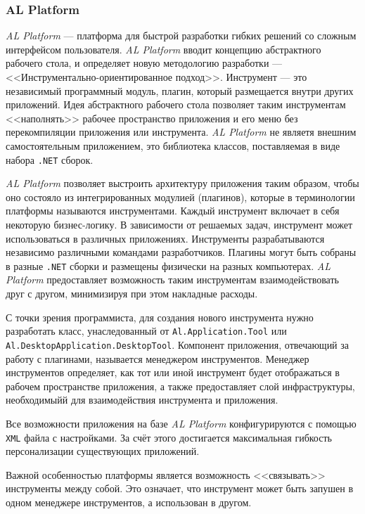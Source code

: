 \subsubsection{AL Platform}


{\it AL Platform} --- платформа для быстрой разработки гибких решений со сложным интерфейсом пользователя. {\it AL Platform} вводит концепцию абстрактного рабочего стола, и определяет новую методологию разработки --- <<Инструментально-ориентированное подход>>. Инструмент --- это независимый программный модуль, плагин, который размещается внутри других приложений. Идея абстрактного рабочего стола позволяет таким инструментам <<наполнять>> рабочее пространство приложения и его меню без перекомпиляции приложения или инструмента. {\it AL Platform} не являетя внешним самостоятельным приложением, это библиотека классов, поставляемая в виде набора {\tt .NET} сборок. 

{\it AL Platform} позволяет выстроить архитектуру приложения таким образом, чтобы оно состояло из интегрированных модулией (плагинов), которые в терминологии платформы называются инструментами. Каждый инструмент включает в себя некоторую бизнес-логику. В зависимости от решаемых задач, инструмент может использоваться в различных приложениях. Инструменты разрабатываются независимо различными командами разработчиков. Плагины могут быть собраны в разные {\tt .NET} сборки и размещены физически на разных компьютерах. {\it AL Platform} предоставляет возможность таким инструментам взаимодействовать друг с другом, минимизируя при этом накладные расходы.

С точки зрения программиста, для создания нового инструмента нужно разработать класс, унаследованный от {\tt Al.Application.Tool} или {\tt Al.DesktopApplication.DesktopTool}. Компонент приложения, отвечающий за работу с плагинами, называется менеджером инструментов. Менеджер инструментов определяет, как тот или иной инструмент будет отображаться в рабочем пространстве приложения, а также предоставляет слой инфраструктуры, необходимыйй для взаимодействия инструмента и приложения. 

Все возможности приложения на базе {\it AL Platform} конфигурируются с помощью {\tt XML} файла с настройками. За счёт этого достигается максимальная гибкость персонализации существующих приложений.

Важной особенностью платформы является возможность <<связывать>> инструменты между собой. Это означает, что инструмент может быть запушен в одном менеджере инструментов, а использован в другом.
